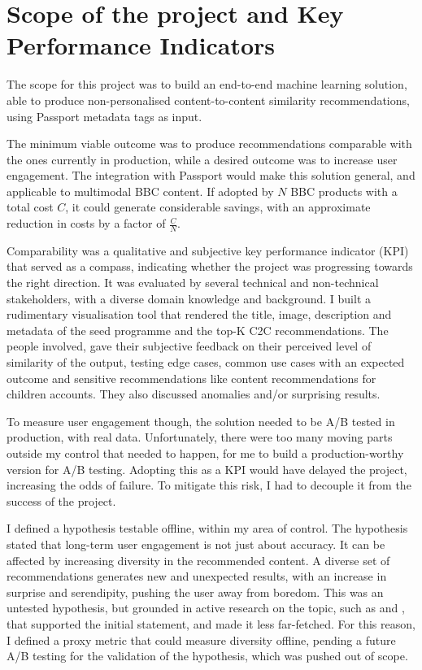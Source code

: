 
\section{Scope of the project and Key Performance Indicators}

The scope for this project was to build an end-to-end machine learning solution, able to produce non-personalised content-to-content
similarity recommendations, using Passport metadata tags as input.

The minimum viable outcome was to produce recommendations comparable with the ones currently in production, while a
desired outcome was to increase user engagement. The integration with Passport would make this solution general,
and applicable to multimodal BBC content. If adopted by $N$ BBC products with a total cost $C$,
it could generate considerable savings, with an approximate reduction in costs by a factor of $\frac{C}{N}$.

Comparability was a qualitative and subjective key performance indicator (KPI) that served as a compass,
indicating whether the project was progressing towards the right direction.
It was evaluated by several technical and non-technical stakeholders, with a diverse domain knowledge and background.
I built a rudimentary visualisation tool that rendered the title, image, description and metadata of the seed programme
and the top-K C2C recommendations.
The people involved, gave their subjective feedback on their perceived level of similarity of the output,
testing edge cases, common use cases with an expected outcome and sensitive recommendations like content recommendations for children accounts.
They also discussed anomalies and/or surprising results.

To measure user engagement though, the solution needed to be A/B tested in production, with real data.
Unfortunately, there were too many moving parts outside my control that needed to happen, for me to build a production-worthy version for A/B testing.
Adopting this as a KPI would have delayed the project, increasing the odds of failure.
To mitigate this risk, I had to decouple it from the success of the project.

I defined a hypothesis testable offline, within my area of control.
The hypothesis stated that long-term user engagement is not just about accuracy. It can be affected by increasing diversity in the recommended content.
A diverse set of recommendations generates new and unexpected results, with an increase in surprise and serendipity, pushing the user away from boredom.
This was an untested hypothesis, but grounded in active research on the topic, such as \cite{Kaminskas2016DiversitySN} and
\cite{duricic2023beyondaccuracyreviewdiversityserendipity}, that supported the initial statement, and made it less far-fetched.
For this reason, I defined a proxy metric that could measure diversity offline, pending a future A/B testing for the validation of the hypothesis,
which was pushed out of scope.
